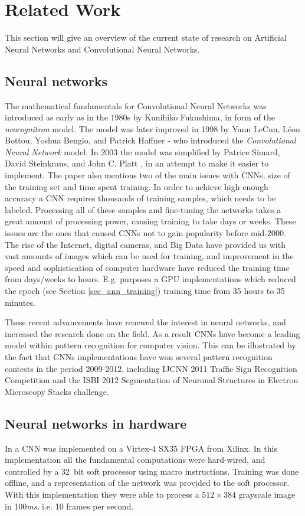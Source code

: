 \chapter{Related Work}

This section will give an overview of the current state of research on Artificial Neural Networks and Convolutional Neural Networks. 

\section{Neural networks}
The mathematical fundamentals for Convolutional Neural Networks was introduced as early as in the 1980s by Kunihiko Fukushima\cite{Fukushima1980}\cite{Fukushima1982}, in form of the \textit{neocognitron} model. The model was later improved in 1998 by  Yann LeCun, Léon Bottou, Yoshua Bengio, and Patrick Haffner - who introduced the \textit{Convolutional Neural Network} model. In 2003 the model was simplified by Patrice Simard, David Steinkraus, and John C. Platt \cite{Simard2000}, in an attempt to make it easier to implement. The paper also mentions two of the main issues with CNNs, size of the training set and time spent training. In order to achieve high enough accuracy a CNN requires thousands of training samples, which needs to be labeled. Processing all of these samples and fine-tuning the networks takes a great amount of processing power, causing training to take days or weeks. These issues are the ones that caused CNNs not to gain popularity before mid-2000. The rise of the Internet, digital cameras, and Big Data have provided us with vast amounts of images which can be used for training, and improvement in the speed and sophistication of computer hardware have reduced the training time from days/weeks to hours. E.g. \cite{Cires2003} purposes a GPU implementations which reduced the epoch (see Section \ref{sec_ann_training}) training time from 35 hours to 35 minutes. 

These recent advancements have renewed the interest in neural networks, and increased the research done on the field. As a result CNNs have become a leading model within pattern recognition for computer vision. This can be illustrated by the fact that CNNs implementations have won several pattern recognition contests in the period 2009-2012, including IJCNN 2011 Traffic Sign Recognition Competition\cite{Ciresan2012} and the ISBI 2012 Segmentation of Neuronal Structures in Electron Microscopy Stacks challenge\cite{DanC.Ciresan2012}.


\section{Neural networks in hardware}

In \cite{Farabet2009} a CNN was implemented on a Virtex-4 SX35 FPGA from Xilinx. In this implementation all the fundamental computations were hard-wired, and controlled by a 32~bit soft processor using macro instructions. Training was done offline, and a representation of the network was provided to the soft processor. With this implementation they were able to process a $ 512 \times 384 $ grayscale image in 100\textit{ms}, i.e. 10 frames per second. 
